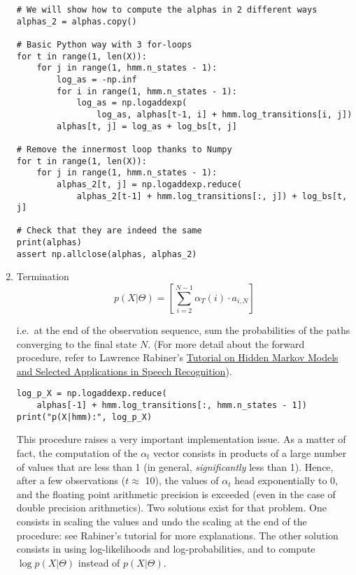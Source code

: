 \documentclass[11pt]{article}
\begin{document}
\begin{enumerate}
\begin{verbatim}
# We will show how to compute the alphas in 2 different ways
alphas_2 = alphas.copy()

# Basic Python way with 3 for-loops
for t in range(1, len(X)):
    for j in range(1, hmm.n_states - 1):
        log_as = -np.inf
        for i in range(1, hmm.n_states - 1):
            log_as = np.logaddexp(
                log_as, alphas[t-1, i] + hmm.log_transitions[i, j])
        alphas[t, j] = log_as + log_bs[t, j]

# Remove the innermost loop thanks to Numpy
for t in range(1, len(X)):
    for j in range(1, hmm.n_states - 1):
        alphas_2[t, j] = np.logaddexp.reduce(
            alphas_2[t-1] + hmm.log_transitions[:, j]) + log_bs[t, j]

# Check that they are indeed the same
print(alphas)
assert np.allclose(alphas, alphas_2)
\end{verbatim}

\item Termination
\label{sec:org6519c68}
$$
        p(X|\Theta) = \left[ \sum_{i=2}^{N-1} \alpha_{T}(i) \cdot a_{i,N} \right]
$$

i.e. at the end of the observation sequence, sum the probabilities of
the paths converging to the final state \(N\). (For more detail about the
forward procedure, refer to Lawrence Rabiner's
\href{http://web.mit.edu/6.435/www/Rabiner89.pdf}{Tutorial on Hidden Markov
Models and Selected Applications in Speech Recognition}).

\begin{verbatim}
log_p_X = np.logaddexp.reduce(
    alphas[-1] + hmm.log_transitions[:, hmm.n_states - 1])
print("p(X|hmm):", log_p_X)
\end{verbatim}

This procedure raises a very important implementation issue. As a matter
of fact, the computation of the \(\alpha_t\) vector consists in products
of a large number of values that are less than 1 (in general,
\emph{significantly} less than 1). Hence, after a few observations
(\(t \approx\) 10), the values of \(\alpha_t\) head exponentially to 0, and
the floating point arithmetic precision is exceeded (even in the case of
double precision arithmetics). Two solutions exist for that problem. One
consists in scaling the values and undo the scaling at the end of the
procedure: see Rabiner's tutorial for more explanations. The other
solution consists in using log-likelihoods and log-probabilities, and to
compute \(\log p(X|\Theta)\) instead of \(p(X|\Theta)\).
\end{enumerate}
\end{document}

